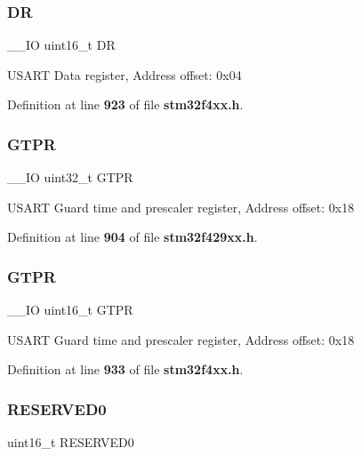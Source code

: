 \subsubsection{DR\hspace{0.1cm}{\footnotesize\ttfamily [2/2]}}
{\footnotesize\ttfamily \+\_\+\+\_\+\+IO uint16\+\_\+t DR}

U\+S\+A\+RT Data register, Address offset\+: 0x04 

Definition at line \textbf{ 923} of file \textbf{ stm32f4xx.\+h}.

\mbox{\label{structUSART__TypeDef_a5dd0cb6c861eaf26470f56f451c1edbf}} 
\subsubsection{G\+T\+PR\hspace{0.1cm}{\footnotesize\ttfamily [1/2]}}
{\footnotesize\ttfamily \+\_\+\+\_\+\+IO uint32\+\_\+t G\+T\+PR}

U\+S\+A\+RT Guard time and prescaler register, Address offset\+: 0x18 

Definition at line \textbf{ 904} of file \textbf{ stm32f429xx.\+h}.

\mbox{\label{structUSART__TypeDef_a26f8b74978e03c8a4c99c9395a6a524d}} 
\subsubsection{G\+T\+PR\hspace{0.1cm}{\footnotesize\ttfamily [2/2]}}
{\footnotesize\ttfamily \+\_\+\+\_\+\+IO uint16\+\_\+t G\+T\+PR}

U\+S\+A\+RT Guard time and prescaler register, Address offset\+: 0x18 

Definition at line \textbf{ 933} of file \textbf{ stm32f4xx.\+h}.

\mbox{\label{structUSART__TypeDef_a149feba01f9c4a49570c6d88619f504f}} 
\subsubsection{R\+E\+S\+E\+R\+V\+E\+D0}
{\footnotesize\ttfamily uint16\+\_\+t R\+E\+S\+E\+R\+V\+E\+D0}

